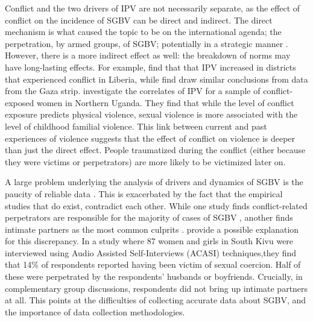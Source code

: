 \documentclass[10pt,a4paper]{scrartcl} %
\begin{document}
Conflict and the two drivers of IPV are not necessarily separate, as the effect of conflict on the incidence of SGBV can be direct and indirect. The direct mechanism is what caused the topic to be on the international agenda; the perpetration, by armed groups, of SGBV; potentially in a strategic manner \citep{Baaz2013,Kirby2015}. However, there is a more indirect effect as well: the breakdown of norms may have long-lasting effects. For example, \cite{Kelly2018} find that that IPV increased in districts that experienced conflict in Liberia, while \cite{Muller2019} find draw similar conclusions from data from the Gaza strip. \cite{Saile2013} investigate the correlates of IPV for a sample of conflict-exposed women in Northern Uganda. They find that while the level of conflict exposure predicts physical violence, sexual violence is more associated with the level of childhood familial violence. This link between current and past experiences of violence suggests that the effect of conflict on violence is deeper than just the direct effect. People traumatized during the conflict (either because they were victims or perpetrators) are more likely to be victimized later on. 


A large problem underlying the analysis of drivers and dynamics of SGBV is the paucity of reliable data \citep{Palermo2011}. This is exacerbated by the fact that the empirical studies that do exist, contradict each other. While one study finds conflict-related perpetrators are responsible for the majority of cases of SGBV \citep{Johnson2010}, another finds intimate partners as the most common culprits \citep{Peterman2011}. \citet{Stark2017} provide a possible explanation for this discrepancy. In a study where 87 women and girls in South Kivu were interviewed using Audio Assisted Self-Interviews (ACASI) techniques,they find that 14\% of respondents reported having been victim of sexual coercion. Half of these were perpetrated by the respondents' husbands or boyfriends. Crucially, in complementary group discussions, respondents did not bring up intimate partners at all. This points at the difficulties of collecting accurate data about SGBV, and the importance of data collection methodologies. 
\end{document}
